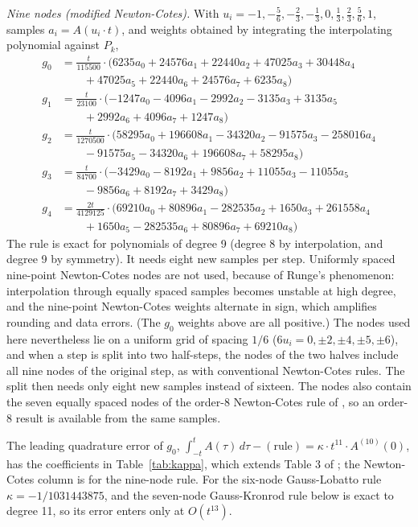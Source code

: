 \documentclass[12pt]{article}
\begin{document}
\emph{Nine nodes (modified Newton-Cotes).} With $u_i=-1,-\frac{5}{6},-\frac{2}{3},-\frac{1}{3},0,\frac{1}{3},\frac{2}{3},\frac{5}{6},1$, samples $a_i=A(u_i\cdot t)$, and weights obtained by integrating the interpolating polynomial against $P_k$,
\begin{equation}
\begin{aligned}
g_{0}&=\tfrac{t}{115500}\cdot(6235a_{0}+24576a_{1}+22440a_{2}+47025a_{3}+30448a_{4}\\
&\qquad+47025a_{5}+22440a_{6}+24576a_{7}+6235a_{8})\\
g_{1}&=\tfrac{t}{23100}\cdot(-1247a_{0}-4096a_{1}-2992a_{2}-3135a_{3}+3135a_{5}\\
&\qquad+2992a_{6}+4096a_{7}+1247a_{8})\\
g_{2}&=\tfrac{t}{1270500}\cdot(58295a_{0}+196608a_{1}-34320a_{2}-91575a_{3}-258016a_{4}\\
&\qquad-91575a_{5}-34320a_{6}+196608a_{7}+58295a_{8})\\
g_{3}&=\tfrac{t}{84700}\cdot(-3429a_{0}-8192a_{1}+9856a_{2}+11055a_{3}-11055a_{5}\\
&\qquad-9856a_{6}+8192a_{7}+3429a_{8})\\
g_{4}&=\tfrac{2t}{4129125}\cdot(69210a_{0}+80896a_{1}-282535a_{2}+1650a_{3}+261558a_{4}\\
&\qquad+1650a_{5}-282535a_{6}+80896a_{7}+69210a_{8})
\end{aligned}\label{eq:nine}
\end{equation}
The rule is exact for polynomials of degree 9 (degree 8 by interpolation, and degree 9 by symmetry). It needs eight new samples per step. Uniformly spaced nine-point Newton-Cotes nodes are not used, because of Runge's phenomenon: interpolation through equally spaced samples becomes unstable at high degree, and the nine-point Newton-Cotes weights alternate in sign, which amplifies rounding and data errors. (The $g_0$ weights above are all positive.) The nodes used here nevertheless lie on a uniform grid of spacing $1/6$ ($6u_i=0,\pm2,\pm4,\pm5,\pm6$), and when a step is split into two half-steps, the nodes of the two halves include all nine nodes of the original step, as with conventional Newton-Cotes rules. The split then needs only eight new samples instead of sixteen. The nodes also contain the seven equally spaced nodes of the order-8 Newton-Cotes rule of \cite{j28}, so an order-8 result is available from the same samples.

The leading quadrature error of $g_0$, $\int_{-t}^{t}A(\tau)\,d\tau-(\text{rule})=\kappa\cdot t^{11}\cdot A^{(10)}(0)$, has the coefficients in Table~\ref{tab:kappa}, which extends Table 3 of \cite{j28}; the Newton-Cotes column is for the nine-node rule. For the six-node Gauss-Lobatto rule $\kappa=-1/1031443875$, and the seven-node Gauss-Kronrod rule below is exact to degree 11, so its error enters only at $O(t^{13})$.
\end{document}
